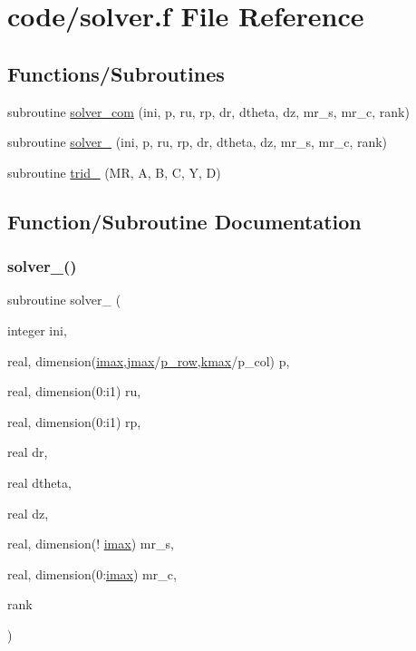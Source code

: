 \hypertarget{solver_8f}{}\section{code/solver.f File Reference}
\label{solver_8f}
\subsection*{Functions/\+Subroutines}
\begin{DoxyCompactItemize}
\item 
subroutine \hyperlink{solver_8f_ac440afb4699e9aaf116567db907fbe0a}{solver\+\_\+com} (ini, p, ru, rp, dr, dtheta, dz, mr\+\_\+s, mr\+\_\+c, rank)
\item 
subroutine \hyperlink{solver_8f_a273beed284a8c057b3ab69a4b77283ee}{solver\+\_} (ini, p, ru, rp, dr, dtheta, dz, mr\+\_\+s, mr\+\_\+c, rank)
\item 
subroutine \hyperlink{solver_8f_a79ec1c9d10f32a5e44da1ba7ba5b6374}{trid\+\_} (MR, A, B, C, Y, D)
\end{DoxyCompactItemize}


\subsection{Function/\+Subroutine Documentation}
\mbox{\label{solver_8f_a273beed284a8c057b3ab69a4b77283ee}} 
\subsubsection{\texorpdfstring{solver\+\_()}{solver\_2()}}
{\footnotesize\ttfamily subroutine solver\+\_ (\begin{DoxyParamCaption}\item[{integer}]{ini,  }\item[{real, dimension(\hyperlink{param_8h_a788916a7426baf172c67386359720d6d}{imax},\hyperlink{param_8h_ac5c80d846ec0c4cf1c91fc5d9d66faa1}{jmax}/\hyperlink{param_8h_a149afb59990224def797b29467985bac}{p\+\_\+row},\hyperlink{param_8h_ae0453dd20a7c6a923904df942ef82468}{kmax}/p\+\_\+col)}]{p,  }\item[{real, dimension(0\+:i1)}]{ru,  }\item[{real, dimension(0\+:i1)}]{rp,  }\item[{real}]{dr,  }\item[{real}]{dtheta,  }\item[{real}]{dz,  }\item[{real, dimension(! \hyperlink{param_8h_a788916a7426baf172c67386359720d6d}{imax})}]{mr\+\_\+s,  }\item[{real, dimension(0\+:\hyperlink{param_8h_a788916a7426baf172c67386359720d6d}{imax})}]{mr\+\_\+c,  }\item[{}]{rank }\end{DoxyParamCaption})}

